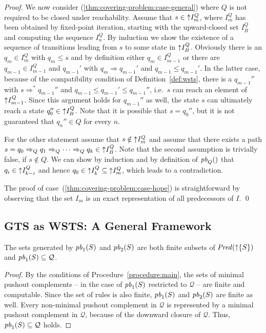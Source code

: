 \documentclass{llncs}
\newcommand{\predBasis}[2][]{\ensuremath{\mathit{pb}\ifthenelse{\equal{#1}{}}{}{_{#1}}(#2)}}
\newcommand{\pred}[2][]{\ensuremath{\mathit{Pred}\ifthenelse{\equal{#1}{}}{}{_{#1}}(#2)}}
\begin{document}
{\begin{proof}
  We now consider (\ref{thm:covering-problem:case-general}) where $Q$
  is not required to be closed under reachability. Assume that
  $s \in \mathord{\uparrow} I^Q_m$, where $I^Q_m$ has been obtained by
  fixed-point iteration, starting with the upward-closed set $I^Q_B$ and
  computing the sequence $I^Q_n$. By induction we show the existence of a 
  sequence of transitions leading from $s$ to some state in $\mathord{\uparrow} I^Q_B$.
  Obviously there is an $q_m \in I^Q_m$ with $q_m \leq s$ and by definition 
  either $q_m \in I^Q_{m-1}$ or there are $q_{m-1} \in I^Q_{m-1}$ and 
  $q_{m-1}'$ with $q_m \Rightarrow q_{m-1}'$ and $q_{m-1} \leq q_{m-1}'$. In 
  the latter case, because of the compatibility condition of 
  Definition~\ref{def:wsts}, there is a $q_{m-1}''$ with $s \Rightarrow^* 
  q_{m-1}''$ and $q_{m-1} \leq q_{m-1}' \leq q_{m-1}''$, i.e.~$s$ can reach an 
  element of $\mathord{\uparrow} I^Q_{m-1}$. Since this argument holds for 
  $q_{m-1}''$ as well, the state $s$ can ultimately reach a state $q_0'' \in 
  \mathord{\uparrow} I^Q_B$. Note that it is possible that $s = q_0''$, but it is not 
  guaranteed that $q_n'' \in Q$ for every $n$.

  For the other statement assume that $s \notin \mathord{\uparrow} I^Q_m$ and
  assume that there exists a path $s = q_0 \Rightarrow_Q q_1 \Rightarrow_Q
  \dots \Rightarrow_Q q_k \in \mathord{\uparrow} I^Q_B$. Note that the second 
  assumption is trivially false, if $s \notin Q$. We can show by induction and 
  by definition of \predBasis[Q]{} that 
  $q_i \in \mathord{\uparrow} I^Q_{k-i}$ and hence $q_0 \in \mathord{\uparrow} I^Q_k \subseteq 
  \mathord{\uparrow} I^Q_m$, which leads to a contradiction.

  The proof of case~(\ref{thm:covering-problem:case-hope}) is
  straightforward by observing that the set $I_m$ is an exact
  representation of all predecessors of $I$. \qed
\end{proof}

\subsection{GTS as WSTS: A General Framework}

\begin{lemma}\label{lem:proc-correctness1}
The sets generated by \predBasis[1]{S} and \predBasis[2]{S} are both finite 
subsets of \pred{\upclosed{\{S\}}} and $\predBasis[1]{S} \subseteq \mathcal{Q}$.
\end{lemma}

\begin{proof}
  By the conditions of Procedure~\ref{procedure:main}, the sets of minimal 
  pushout complements -- in the case of \predBasis[1]{S} restricted to 
  $\mathcal{Q}$ -- are finite and computable. Since the set of rules is also 
  finite, \predBasis[1]{S} and \predBasis[2]{S} are finite as well.
  Every non-minimal pushout complement in $\mathcal{Q}$ is represented by a 
  minimal pushout complement in $\mathcal{Q}$, because of the downward closure 
  of $\mathcal{Q}$. Thus, $\predBasis[1]{S} \subseteq \mathcal{Q}$ holds.


\end{proof}}
\end{document}
